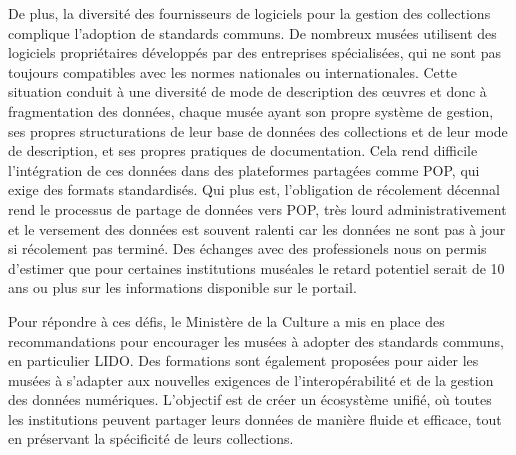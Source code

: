 De plus, la diversité des fournisseurs de logiciels pour la gestion des collections complique l’adoption de standards communs. De nombreux musées utilisent des logiciels propriétaires développés par des entreprises spécialisées, qui ne sont pas toujours compatibles avec les normes nationales ou internationales. Cette situation conduit à une diversité de mode de description des œuvres et donc à fragmentation des données, chaque musée ayant son propre système de gestion, ses propres structurations de leur base de données des collections et de leur mode de description, et ses propres pratiques de documentation. Cela rend difficile l’intégration de ces données dans des plateformes partagées comme POP, qui exige des formats standardisés. Qui plus est, l'obligation de récolement décennal rend le processus de partage de données vers POP, très lourd administrativement et le versement des données est souvent ralenti car les données ne sont pas à jour si récolement pas terminé. Des échanges avec des professionels nous on permis d'estimer que pour certaines institutions muséales le retard potentiel serait de 10 ans ou plus sur les informations disponible sur le portail.\newline

Pour répondre à ces défis, le Ministère de la Culture a mis en place des recommandations pour encourager les musées à adopter des standards communs, en particulier LIDO. Des formations sont également proposées pour aider les musées à s’adapter aux nouvelles exigences de l’interopérabilité et de la gestion des données numériques. L’objectif est de créer un écosystème unifié, où toutes les institutions peuvent partager leurs données de manière fluide et efficace, tout en préservant la spécificité de leurs collections.
